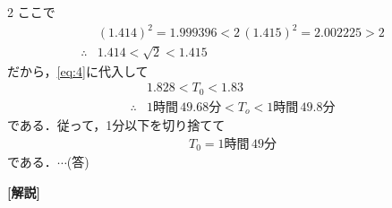 \documentclass[../../main.tex]{subfiles}
\begin{document}
\begin{multicols}{2}
  ここで
  \begin{align}
    & (1.414)^2 = 1.999396 < 2\, (1.415)^2 = 2.002225 > 2 \\
    \therefore
    & 1.414 < \sqrt{2} < 1.415
  \end{align}
  だから，\cref{eq:4}に代入して
  \begin{align}
    & 1.828 < T_0 < 1.83                                         \\
    \therefore
    & 1\text{時間}\,49.68\text{分} < T_o < 1\text{時間}\,49.8\text{分}
  \end{align}
  である．従って，1分以下を切り捨てて
  \begin{align}
    T_0 = 1\text{時間}\,49\text{分}
  \end{align}
  である．$\cdots$(答)

  {\bf [解説]}

  \newpage
\end{multicols}
\end{document}
